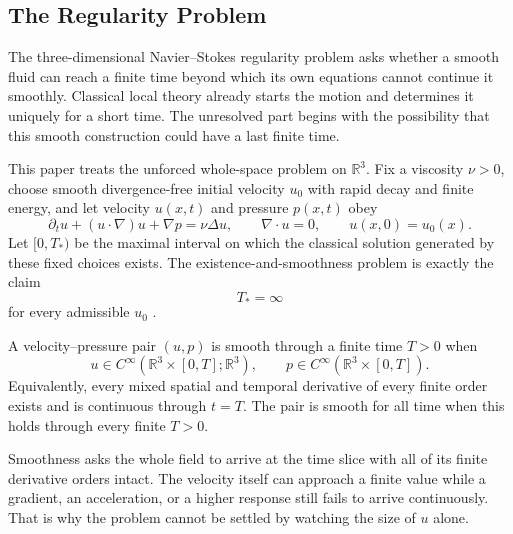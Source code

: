 \subsection{The Regularity Problem}\label{sub:TheRegularityProblem}

The three-dimensional Navier--Stokes regularity problem asks whether a smooth fluid can reach a finite time beyond which its own equations cannot continue it smoothly.
Classical local theory already starts the motion and determines it uniquely for a short time.
The unresolved part begins with the possibility that this smooth construction could have a last finite time.

This paper treats the unforced whole-space problem on \(\mathbb R^3\).
Fix a viscosity \(\nu>0\), choose smooth divergence-free initial velocity \(u_0\) with rapid decay and finite energy, and let velocity \(u(x,t)\) and pressure \(p(x,t)\) obey
\[
  \partial_tu+(u\cdot\nabla)u+\nabla p
  =
  \nu\Delta u,
  \qquad
  \nabla\cdot u=0,
  \qquad
  u(x,0)=u_0(x).
\]
Let \([0,T_*)\) be the maximal interval on which the classical solution generated by these fixed choices exists.
The existence-and-smoothness problem is exactly the claim
\[
  T_*=\infty
\]
for every admissible \(u_0\) \parencite{Fefferman2000}.


\begin{definition}[Smoothness]\label{def:Smoothness}
A velocity--pressure pair \((u,p)\) is smooth through a finite time \(T>0\) when
\[
  u\in C^\infty\!\left(\mathbb R^3\times[0,T];\mathbb R^3\right),
  \qquad
  p\in C^\infty\!\left(\mathbb R^3\times[0,T]\right).
\]
Equivalently, every mixed spatial and temporal derivative of every finite order exists and is continuous through \(t=T\).
The pair is smooth for all time when this holds through every finite \(T>0\).
\end{definition}

Smoothness asks the whole field to arrive at the time slice with all of its finite derivative orders intact.
The velocity itself can approach a finite value while a gradient, an acceleration, or a higher response still fails to arrive continuously.
That is why the problem cannot be settled by watching the size of \(u\) alone.


